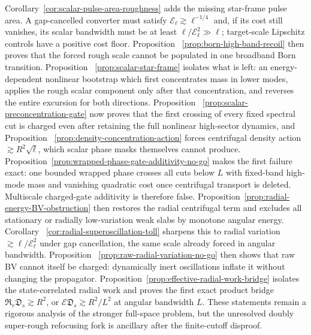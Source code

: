 \documentclass[11pt]{article}
\theoremstyle{definition}
\theoremstyle{remark}
\begin{document}
 Corollary~\ref{cor:scalar-pulse-area-roughness} adds the missing star-frame
 pulse area.  A gap-cancelled converter must satisfy
 $\mathcal E_\ell\gtrsim\ell^{-1/4}$ and, if its cost still vanishes, its scalar
 bandwidth must be at least $\ell/\mathcal E_\ell^2\gg\ell$; target-scale
 Lipschitz controls have a positive cost floor.  Proposition
 ~\ref{prop:born-high-band-recoil} then proves that the forced rough scale
 cannot be populated in one broadband Born transition.  Proposition
 ~\ref{prop:scalar-star-frame} isolates what is left: an energy-dependent
 nonlinear bootstrap which first concentrates mass in lower modes, applies the
 rough scalar component only after that concentration, and reverses the entire
 excursion for both directions.  Proposition
 ~\ref{prop:scalar-preconcentration-gate} now proves that the first crossing of
 every fixed spectral cut is charged even after retaining the full nonlinear
 high-sector dynamics, and Proposition
 ~\ref{prop:density-concentration-action} forces centrifugal density action
 $\gtrsim R^2\sqrt\ell$, which scalar phase masks themselves cannot produce.
 Proposition~\ref{prop:wrapped-phase-gate-additivity-no-go} makes the first
 failure exact: one bounded wrapped phase crosses all cuts below $L$ with
 fixed-band high-mode mass and vanishing quadratic cost once centrifugal
 transport is deleted.  Multiscale charged-gate additivity is therefore false.
Proposition~\ref{prop:radial-energy-BV-obstruction} then restores the radial
centrifugal term and excludes all stationary or radially low-variation weak
slabs by monotone angular energy.  Corollary
~\ref{cor:radial-superoscillation-toll} sharpens this to radial variation
$\gtrsim\ell/\mathcal E_\ell^2$ under gap cancellation, the same scale already
forced in angular bandwidth.  Proposition
~\ref{prop:raw-radial-variation-no-go} then shows that raw BV cannot itself be
charged: dynamically inert oscillations inflate it without changing the
propagator.  Proposition~\ref{prop:effective-radial-work-bridge} isolates the
state-correlated radial work and proves the first exact product bridge
$\mathfrak R_v\mathfrak D_s\gtrsim R^2$, or
$\mathcal E\mathfrak D_s\gtrsim R^2/L^2$ at angular bandwidth $L$.  These
statements remain a rigorous analysis of the stronger full-space problem, but
the unresolved doubly super-rough refocusing fork is ancillary after the
finite-cutoff disproof.
\end{document}
